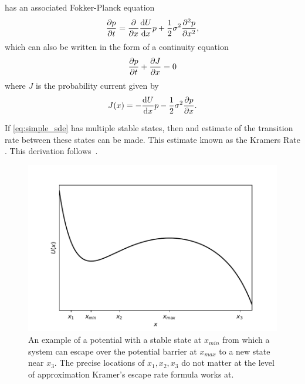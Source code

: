  has an associated Fokker-Planck equation
\begin{equation}
  \label{eq:fokker_planck_one_d}
  \pdv{p}{t} = \pdv{x} \dv{U}{x}p + \frac{1}{2}\sigma^2 \pdv[2]{p}{x},
\end{equation}
which can also be written in the form of a continuity equation
\begin{equation}
  \label{eq:fokker_planck_continuity}
  \pdv{p}{t} + \pdv{J}{x} = 0
\end{equation}
where $J$ is the probability current given by
\begin{equation}
  \label{eq:probability_current}
  J(x) = -\dv{U}{x}p - \frac{1}{2}\sigma^2 \pdv{p}{x}.
\end{equation}

If \cref{eq:simple_sde} has multiple stable states, then and estimate of the transition rate between these states can be made. This estimate known
as the Kramers Rate \parencite{Kramers1940}. This derivation follows~\cite{Risken1984}.

\begin{figure}
  \centering
  \includegraphics[width=\textwidth,keepaspectratio]{potential_to_escape}
  \caption{An example of a potential with a stable state at $x_{min}$ from which a system can escape over the potential barrier at $x_{max}$ to a new state near $x_3$.
  The precise locations of $x_1,x_2,x_3$ do not matter at the level of approximation Kramer's escape rate formula works at.}
  \label{fig:potential_to_escape}
\end{figure}

